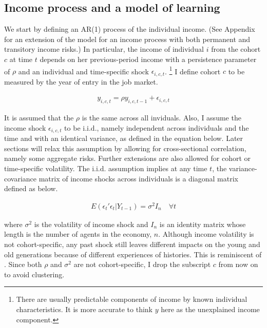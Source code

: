 \documentclass[12pt,notitlepage,onecolumn,aps,pra]{article}
\begin{document}
\hypertarget{income-process-and-a-model-of-learning}{%
\subsection{Income process and a model of
learning}\label{income-process-and-a-model-of-learning}}

We start by defining an AR(1) process of the individual income. (See
Appendix for an extension of the model for an income process with both
permanent and transitory income risks.) In particular, the income of
individual \(i\) from the cohort \(c\) at time \(t\) depends on her
previous-period income with a persistence parameter of \(\rho\) and an
individual and time-specific shock \(\epsilon_{i,c,t}\).
\footnote{There are usually predictable components of income by known individual characteristics. It is more accurate to think $y$ here as the unexplained income component. }
I define cohort \(c\) to be measured by the year of entry in the job
market.

\begin{eqnarray}
y_{i,c,t} = \rho y_{i,c,t-1} + \epsilon_{i,c,t}
\end{eqnarray}

It is assumed that the \(\rho\) is the same across all inviduals. Also,
I assume the income shock \(\epsilon_{i,c,t}\) to be i.i.d., namely
independent across individuals and the time and with an identical
variance, as defined in the equation below. Later sections will relax
this assumption by allowing for cross-sectional correlation, namely some
aggregate risks. Further extensions are also allowed for cohort or
time-specific volatility. The i.i.d. assumption implies at any time
\(t\), the variance-covariance matrix of income shocks across
individuals is a diagonal matrix defined as below.

\begin{eqnarray}
E(\epsilon_{t}'\epsilon_{t}|Y_{t-1}) = \sigma^2 I_n \quad \forall t 
\end{eqnarray}

where \(\sigma^2\) is the volatility of income shock and \(I_n\) is an
identity matrix whose length is the number of agents in the economy,
\(n\). Although income volatility is not cohort-specific, any past shock
still leaves different impacts on the young and old generations because
of different experiences of histories. This is reminiscent of
\cite{bansal2004risks}. Since both \(\rho\) and \(\sigma^2\) are not
cohort-specific, I drop the subscript \(c\) from now on to avoid
clustering.
\end{document}

